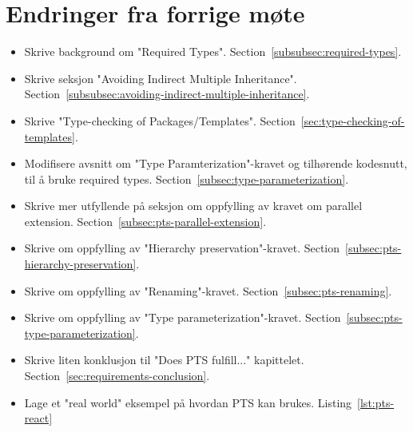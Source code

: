 
\chapter*{Endringer fra forrige møte}

\begin{itemize}
    \item Skrive background om "Required Types".
    Section~\vref{subsubsec:required-types}.
    \item Skrive seksjon "Avoiding Indirect Multiple Inheritance".
    Section~\vref{subsubsec:avoiding-indirect-multiple-inheritance}.
    \item Skrive "Type-checking of Packages/Templates".
    Section~\vref{sec:type-checking-of-templates}.
    \item Modifisere avsnitt om "Type Paramterization"-kravet og tilhørende kodesnutt, til å bruke required types.
    Section~\vref{subsec:type-parameterization}.
    \item Skrive mer utfyllende på seksjon om oppfylling av kravet om parallel extension.
    Section~\vref{subsec:pts-parallel-extension}.
    \item Skrive om oppfylling av "Hierarchy preservation"-kravet.
    Section~\vref{subsec:pts-hierarchy-preservation}.
    \item Skrive om oppfylling av "Renaming"-kravet.
    Section~\vref{subsec:pts-renaming}.
    \item Skrive om oppfylling av "Type parameterization"-kravet.
    Section~\vref{subsec:pts-type-parameterization}.
    \item Skrive liten konklusjon til "Does PTS fulfill..." kapittelet.
    Section~\vref{sec:requirements-conclusion}.
    \item Lage et "real world" eksempel på hvordan PTS kan brukes.
    Listing~\vref{lst:pts-react}
\end{itemize}

